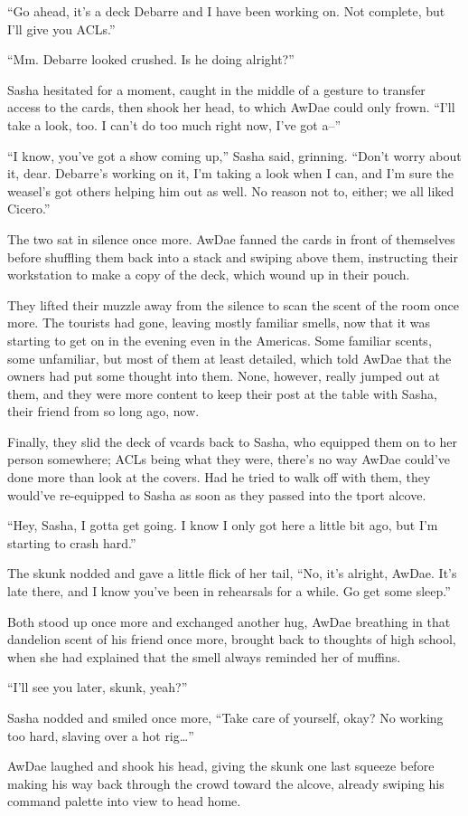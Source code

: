 ``Go ahead, it's a deck Debarre and I have been working on.  Not complete, but I'll give you ACLs.''

``Mm.  Debarre looked crushed.  Is he doing alright?''

Sasha hesitated for a moment, caught in the middle of a gesture to transfer access to the cards, then shook her head, to which AwDae could only frown.  ``I'll take a look, too.  I can't do too much right now, I've got a--''

``I know, you've got a show coming up,'' Sasha said, grinning.  ``Don't worry about it, dear.  Debarre's working on it, I'm taking a look when I can, and I'm sure the weasel's got others helping him out as well.  No reason not to, either; we all liked Cicero.''

The two sat in silence once more.  AwDae fanned the cards in front of themselves before shuffling them back into a stack and swiping above them, instructing their workstation to make a copy of the deck, which wound up in their pouch.

They lifted their muzzle away from the silence to scan the scent of the room once more.  The tourists had gone, leaving mostly familiar smells, now that it was starting to get on in the evening even in the Americas.  Some familiar scents, some unfamiliar, but most of them at least detailed, which told AwDae that the owners had put some thought into them.  None, however, really jumped out at them, and they were more content to keep their post at the table with Sasha, their friend from so long ago, now.

Finally, they slid the deck of vcards back to Sasha, who equipped them on to her person somewhere; ACLs being what they were, there's no way AwDae could've done more than look at the covers.  Had he tried to walk off with them, they would've re-equipped to Sasha as soon as they passed into the tport alcove.

``Hey, Sasha, I gotta get going.  I know I only got here a little bit ago, but I'm starting to crash hard.''

The skunk nodded and gave a little flick of her tail, ``No, it's alright, AwDae.  It's late there, and I know you've been in rehearsals for a while.  Go get some sleep.''

Both stood up once more and exchanged another hug, AwDae breathing in that dandelion scent of his friend once more, brought back to thoughts of high school, when she had explained that the smell always reminded her of muffins.

``I'll see you later, skunk, yeah?''

Sasha nodded and smiled once more, ``Take care of yourself, okay?  No working too hard, slaving over a hot rig\ldots{}''

AwDae laughed and shook his head, giving the skunk one last squeeze before making his way back through the crowd toward the alcove, already swiping his command palette into view to head home.
